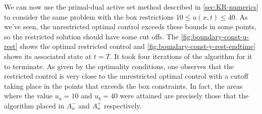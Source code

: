 \documentclass[../thesis.tex]{subfiles}
\begin{document}
We can now use the primal-dual active set method described in \cref{sec:KR-numerics} to consider the same problem with the box restrictions $10 \leq u(x, t) \leq 40$. As we've seen, the unrestricted optimal control exceeds these bounds in some points, so the restricted solution should have some cut offs.
The \cref{fig:boundary-const-u-rest} shows the optimal restricted control and \cref{fig:boundary-const-y-rest-endtime} shows its associated state at $t = T$. It took four iterations of the algorithm for it to terminate.
As given by the optimality conditions, one observes that the restricted control is very close to the unrestricted optimal control with a cutoff taking place in the points that exceeds the box constraints.
In fact, the areas where the value $u_a = 10$ and $u_b = 40$ were attained are precisely those that the algorithm placed in $A^-_n$ and $A^+_n$ respectively.
\end{document}
